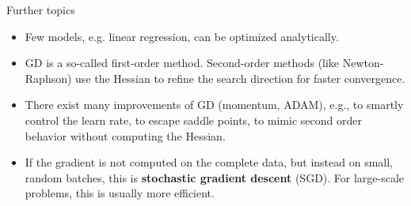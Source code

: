\documentclass[11pt,compress,t,notes=noshow, xcolor=table]{beamer}
\begin{document}
\begin{vbframe}{Further topics}
\begin{itemize}

\item Few models, e.g. linear regression, can be optimized analytically. 

\item GD is a so-called first-order method. Second-order methods (like Newton-Raphson) use the Hessian to refine the search direction for faster convergence.
\item There exist many improvements of GD (momentum, ADAM), e.g., to smartly control the learn rate, to escape saddle points, to mimic second order behavior without computing the Hessian.
\item If the gradient is not computed on the complete data, but instead on small, random batches, this is \textbf{stochastic gradient descent} (SGD). For large-scale problems, this is usually more efficient.
\end{itemize}
\end{vbframe}




\endlecture
\end{document}
